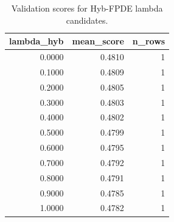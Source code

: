 \begin{table}[t]
\caption{Validation scores for Hyb-FPDE lambda candidates.}
\label{tab:lambda_distribution_computed}
\centering
\begin{tabular}{rrr}
\toprule
lambda\_hyb & mean\_score & n\_rows \\
\midrule
0.0000 & 0.4810 & 1 \\
0.1000 & 0.4809 & 1 \\
0.2000 & 0.4805 & 1 \\
0.3000 & 0.4803 & 1 \\
0.4000 & 0.4802 & 1 \\
0.5000 & 0.4799 & 1 \\
0.6000 & 0.4795 & 1 \\
0.7000 & 0.4792 & 1 \\
0.8000 & 0.4791 & 1 \\
0.9000 & 0.4785 & 1 \\
1.0000 & 0.4782 & 1 \\
\bottomrule
\end{tabular}

\end{table}
